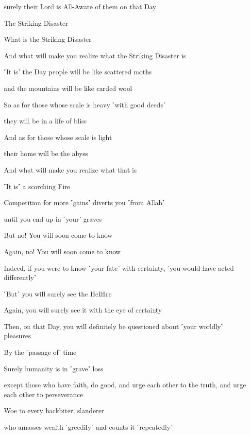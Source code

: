 surely their Lord is All-Aware of them on that Day

The Striking Disaster

What is the Striking Disaster

And what will make you realize what the Striking Disaster is

˹It is˺ the Day people will be like scattered moths

and the mountains will be like carded wool

So as for those whose scale is heavy ˹with good deeds˺

they will be in a life of bliss

And as for those whose scale is light

their home will be the abyss

And what will make you realize what that is

˹It is˺ a scorching Fire

Competition for more ˹gains˺ diverts you ˹from Allah˺

until you end up in ˹your˺ graves

But no! You will soon come to know

Again, no! You will soon come to know

Indeed, if you were to know ˹your fate˺ with certainty, ˹you would have acted differently˺

˹But˺ you will surely see the Hellfire

Again, you will surely see it with the eye of certainty

Then, on that Day, you will definitely be questioned about ˹your worldly˺ pleasures

By the ˹passage of˺ time

Surely humanity is in ˹grave˺ loss

except those who have faith, do good, and urge each other to the truth, and urge each other to perseverance

Woe to every backbiter, slanderer

who amasses wealth ˹greedily˺ and counts it ˹repeatedly˺

